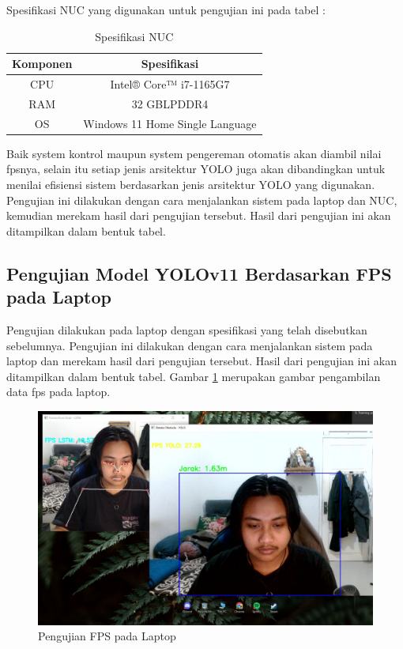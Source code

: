 Spesifikasi NUC yang digunakan untuk pengujian ini pada tabel  :

\begin{longtable}{|c|c|}
    \caption{Spesifikasi NUC}
    \label{tb:Spesifikasi NUC}                             \\
    \hline   
    \rowcolor[HTML]{C0C0C0}
    \textbf{Komponen} & \textbf{Spesifikasi} \\
    \hline
  CPU            &  Intel® Core™ i7-1165G7        \\
  RAM            & 32 GBLPDDR4        \\
  OS            & Windows 11 Home Single Language           \\
  \hline
\end{longtable}

Baik system kontrol maupun system pengereman otomatis akan diambil nilai fpsnya, selain itu setiap jenis arsitektur YOLO juga akan dibandingkan untuk menilai efisiensi sistem berdasarkan jenis arsitektur YOLO yang digunakan. Pengujian ini dilakukan dengan cara menjalankan sistem pada laptop dan NUC, kemudian merekam hasil dari pengujian tersebut. Hasil dari pengujian ini akan ditampilkan dalam bentuk tabel.

\subsection{Pengujian Model YOLOv11 Berdasarkan FPS pada Laptop}

Pengujian dilakukan pada laptop dengan spesifikasi yang telah disebutkan sebelumnya. Pengujian ini dilakukan dengan cara menjalankan sistem pada laptop dan merekam hasil dari pengujian tersebut. Hasil dari pengujian ini akan ditampilkan dalam bentuk tabel. Gambar \ref{fig:Foto pengujian fps laptop} merupakan gambar pengambilan data fps pada laptop.

\begin{figure} [H] \centering
  \includegraphics[scale=0.3]{gambar/devafps.jpg}
  \caption{Pengujian FPS pada Laptop}
  \label{fig:Foto pengujian fps laptop}
\end{figure}

